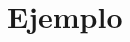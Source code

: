 \documentclass[12pt]{article}
\begin{document}
\section{Ejemplo}


    
    
    
    
\end{document}
